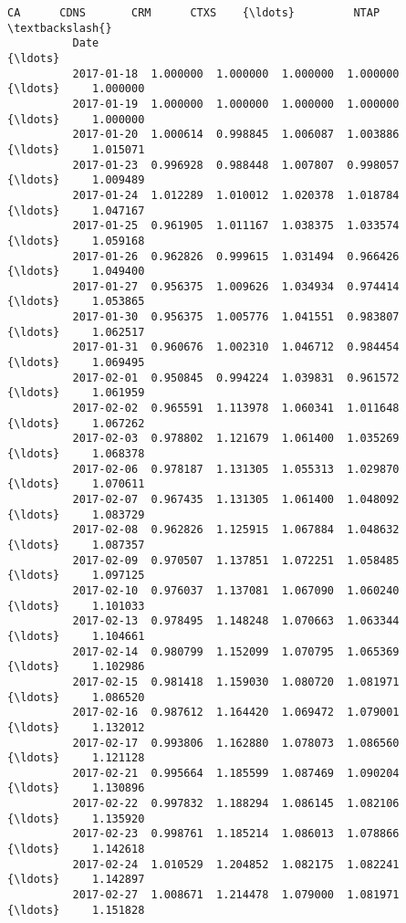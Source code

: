 \documentclass[11pt]{article}
\begin{document}
\begin{Verbatim}[commandchars=\\\{\}]
                            CA      CDNS       CRM      CTXS    {\ldots}         NTAP  \textbackslash{}
          Date                                                  {\ldots}                
          2017-01-18  1.000000  1.000000  1.000000  1.000000    {\ldots}     1.000000   
          2017-01-19  1.000000  1.000000  1.000000  1.000000    {\ldots}     1.000000   
          2017-01-20  1.000614  0.998845  1.006087  1.003886    {\ldots}     1.015071   
          2017-01-23  0.996928  0.988448  1.007807  0.998057    {\ldots}     1.009489   
          2017-01-24  1.012289  1.010012  1.020378  1.018784    {\ldots}     1.047167   
          2017-01-25  0.961905  1.011167  1.038375  1.033574    {\ldots}     1.059168   
          2017-01-26  0.962826  0.999615  1.031494  0.966426    {\ldots}     1.049400   
          2017-01-27  0.956375  1.009626  1.034934  0.974414    {\ldots}     1.053865   
          2017-01-30  0.956375  1.005776  1.041551  0.983807    {\ldots}     1.062517   
          2017-01-31  0.960676  1.002310  1.046712  0.984454    {\ldots}     1.069495   
          2017-02-01  0.950845  0.994224  1.039831  0.961572    {\ldots}     1.061959   
          2017-02-02  0.965591  1.113978  1.060341  1.011648    {\ldots}     1.067262   
          2017-02-03  0.978802  1.121679  1.061400  1.035269    {\ldots}     1.068378   
          2017-02-06  0.978187  1.131305  1.055313  1.029870    {\ldots}     1.070611   
          2017-02-07  0.967435  1.131305  1.061400  1.048092    {\ldots}     1.083729   
          2017-02-08  0.962826  1.125915  1.067884  1.048632    {\ldots}     1.087357   
          2017-02-09  0.970507  1.137851  1.072251  1.058485    {\ldots}     1.097125   
          2017-02-10  0.976037  1.137081  1.067090  1.060240    {\ldots}     1.101033   
          2017-02-13  0.978495  1.148248  1.070663  1.063344    {\ldots}     1.104661   
          2017-02-14  0.980799  1.152099  1.070795  1.065369    {\ldots}     1.102986   
          2017-02-15  0.981418  1.159030  1.080720  1.081971    {\ldots}     1.086520   
          2017-02-16  0.987612  1.164420  1.069472  1.079001    {\ldots}     1.132012   
          2017-02-17  0.993806  1.162880  1.078073  1.086560    {\ldots}     1.121128   
          2017-02-21  0.995664  1.185599  1.087469  1.090204    {\ldots}     1.130896   
          2017-02-22  0.997832  1.188294  1.086145  1.082106    {\ldots}     1.135920   
          2017-02-23  0.998761  1.185214  1.086013  1.078866    {\ldots}     1.142618   
          2017-02-24  1.010529  1.204852  1.082175  1.082241    {\ldots}     1.142897   
          2017-02-27  1.008671  1.214478  1.079000  1.081971    {\ldots}     1.151828   

\end{Verbatim}
\end{document}
